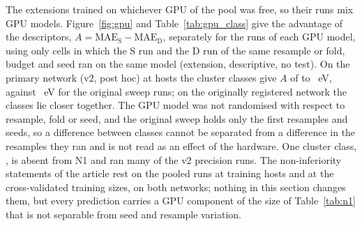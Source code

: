 \begin{table}[htbp]
\caption{GPU repeatability (N1; extension, descriptive). Seed-ensemble site MAE on each GPU model minus that of
the original sweep (eV), for the registered runs of resample \numCfgTuningAnchorResample{} of the originally
registered network; sweep MAE: the seed-ensemble MAE of the original sweep; seed SD: the standard deviation of the
single-run MAE over the three seeds of the original sweep, for scale. The \gpushortaten{} column holds the first pass on the
first node; the second pass and the second node are bitwise identical to it. No \gpufourty{} was free during the
study. Record: \texttt{results/nrp/nrp\_n1\_gpu\_repeat.json}, key \texttt{payload.ensemble}.}
\label{tab:n1}
\centering\small

\end{table}

The extensions trained on whichever GPU of the pool was free, so their runs mix GPU models. Figure~\ref{fig:gpu}
and Table~\ref{tab:gpu_class} give the advantage of the descriptors, $A = \mathrm{MAE}_\mathrm{S} -
\mathrm{MAE}_\mathrm{D}$, separately for the runs of each GPU model, using only cells in which the S run and the D
run of the same resample or fold, budget and seed ran on the same model (extension, descriptive, no test). On the
primary network (v2, post hoc) at \numCfgBudgetsHostsItemSix{} hosts the cluster classes give $A$ of
\numPrecisionABFourHundredBSixHundredFiftyFourDescriptiveGpuClassPrecisionSixHundredFiftyFourVTwoRTXFourThousandNinetyAPairedCellsA{}
to \numPrecisionABFourHundredBSixHundredFiftyFourDescriptiveGpuClassPrecisionSixHundredFiftyFourVTwoATenAPairedCellsA{}~eV,
against \numPrecisionABFourHundredBSixHundredFiftyFourDescriptiveGpuClassPrecisionSixHundredFiftyFourVTwoOriginalSweepAPairedCellsA{}~eV
for the original sweep runs; on the originally registered network the classes lie closer together. The GPU model
was not randomised with respect to resample, fold or seed, and the original sweep holds only the first resamples and
seeds, so a difference between classes cannot be separated from a difference in the resamples they ran and is not
read as an effect of the hardware. One cluster class, \gpufourty{}, is absent from N1 and ran many of the v2
precision runs. The non-inferiority statements of the article rest on the pooled runs at \numCfgBudgetsHostsItemSix{} training
hosts and at the cross-validated training sizes, on both networks; nothing in this section changes them, but every prediction carries a GPU
component of the size of Table~\ref{tab:n1} that is not separable from seed and resample variation.

